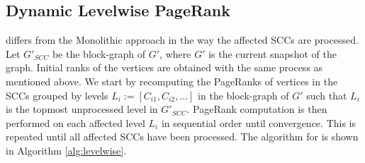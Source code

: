 





\subsection{Dynamic Levelwise PageRank}

\levelwisePR{} differs from the Monolithic approach in the way the affected SCCs are processed. Let $G'_{SCC}$ be the block-graph of $G'$, where $G'$ is the current snapshot of the graph. Initial ranks of the vertices are obtained with the same process as mentioned above. We start by recomputing the PageRanks of vertices in the SCCs grouped by levels $L_i := [C_{i1}, C_{i2}, ...]$ in the block-graph of $G'$ such that $L_i$ is the topmost unprocessed level in $G'_{SCC}$. PageRank computation is then performed on each affected level $L_i$ in sequential order until convergence. This is repeated until all affected SCCs have been processed. The algorithm for \levelwisePR{} is shown in Algorithm \ref{alg:levelwise}.






